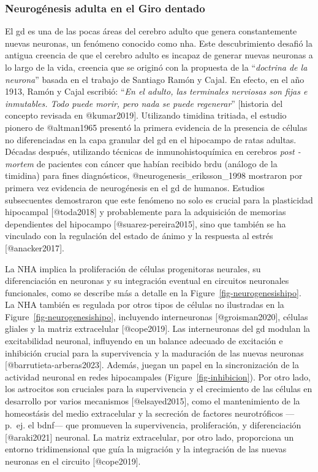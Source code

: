 \documentclass[
  11pt]{../MastersDoctoralThesisUNAM}
\begin{document}
\subsubsection{Neurogénesis adulta en el Giro dentado}\label{sec-nha}

El \ac{gd} es una de las pocas áreas del cerebro adulto que genera
constantemente nuevas neuronas, un fenómeno conocido como \ac{nha}. Este
descubrimiento desafió la antigua creencia de que el cerebro adulto es
incapaz de generar nuevas neuronas a lo largo de la vida, creencia que
se originó con la propuesta de la ``\emph{doctrina de la neurona}''
basada en el trabajo de Santiago Ramón y Cajal. En efecto, en el año
1913, Ramón y Cajal escribió: ``\emph{En el adulto, las terminales
nerviosas son fijas e inmutables. Todo puede morir, pero nada se puede
regenerar}'' {[}historia del concepto revisada en @kumar2019{]}.
Utilizando timidina tritiada, el estudio pionero de @altman1965 presentó
la primera evidencia de la presencia de células no diferenciadas en la
capa granular del \ac{gd} en el hipocampo de ratas adultas. Décadas
después, utilizando técnicas de inmunohistoquímica en cerebros
\emph{post -mortem} de pacientes con cáncer que habían recibido
\ac{brdu} (análogo de la timidina) para fines diagnósticos,
@neurogenesis\_eriksson\_1998 mostraron por primera vez evidencia de
neurogénesis en el \ac{gd} de humanos. Estudios subsecuentes demostraron
que este fenómeno no solo es crucial para la plasticidad hipocampal
{[}@toda2018{]} y probablemente para la adquisición de memorias
dependientes del hipocampo {[}@suarez-pereira2015{]}, sino que también
se ha vinculado con la regulación del estado de ánimo y la respuesta al
estrés {[}@anacker2017{]}.

La NHA implica la proliferación de células progenitoras neurales, su
diferenciación en neuronas y su integración eventual en circuitos
neuronales funcionales, como se describe más a detalle en la
Figure~\ref{fig-neurogenesishipo}. La NHA también es regulada por otros
tipos de células no ilustradas en la Figure~\ref{fig-neurogenesishipo},
incluyendo interneuronas {[}@groisman2020{]}, células gliales y la
matriz extracelular {[}@cope2019{]}. Las interneuronas del \ac{gd}
modulan la excitabilidad neuronal, influyendo en un balance adecuado de
excitación e inhibición crucial para la supervivencia y la maduración de
las nuevas neuronas {[}@barrutieta-arberas2023{]}. Además, juegan un
papel en la sincronización de la actividad neuronal en redes
hipocampales (Figure~\ref{fig-inhibicion}). Por otro lado, los
astrocitos son cruciales para la supervivencia y el crecimiento de las
células en desarrollo por varios mecanismos {[}@elsayed2015{]}, como el
mantenimiento de la homeostásis del medio extracelular y la secreción de
factores neurotróficos ---p.~ej. el \ac{bdnf}--- que promueven la
supervivencia, proliferación, y diferenciación {[}@araki2021{]}
neuronal. La matriz extracelular, por otro lado, proporciona un entorno
tridimensional que guía la migración y la integración de las nuevas
neuronas en el circuito {[}@cope2019{]}.
\end{document}
